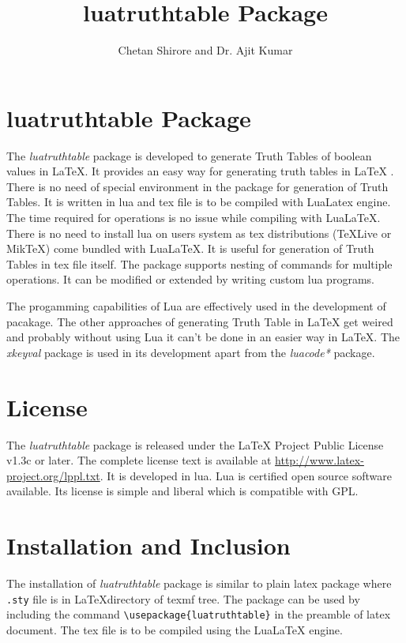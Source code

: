 \documentclass{article}
\begin{document}
\title{luatruthtable Package}
\author{Chetan Shirore and Dr. Ajit Kumar}
\maketitle
\section{luatruthtable Package}
The \emph{luatruthtable} package is developed to generate Truth Tables of boolean values in LaTeX. It provides an easy way for generating truth tables in LaTeX . There is no need of special environment in the package for generation of Truth Tables. It is written in lua and tex file is to be compiled with LuaLatex engine.  The time required for operations is no issue while compiling with LuaLaTeX.  There is no need to install lua on users system as tex distributions (TeXLive or MikTeX) come bundled with LuaLaTeX. It is useful for generation of Truth Tables in tex file itself. The package supports nesting of commands for multiple operations. It can be modified or extended by writing custom lua programs. 

The progamming capabilities of Lua are effectively used in the development of pacakage. The other approaches of generating Truth Table in LaTeX get weired \cite{online.latextruthtable} and probably without using Lua it can't be done in an easier way in LaTeX.  The \emph{xkeyval} package is used in its development apart from the \emph{luacode*} package. 

\section{License} The \emph{luatruthtable} package is released under the LaTeX Project Public License v1.3c or later. The complete license text is available at \url{http://www.latex-project.org/lppl.txt}.
It is developed in lua.  Lua is certified open source software available. Its license is simple and liberal which is compatible with GPL.
\section{Installation and Inclusion}
The installation of  \emph{luatruthtable} package is similar to plain latex package where \texttt{.sty} file is in \LaTeX directory of texmf tree. The package can be used by including the command \texttt{\textbackslash usepackage\{luatruthtable\}} in the preamble of latex document.  The tex file is to be compiled using the LuaLaTeX engine.
\end{document}
